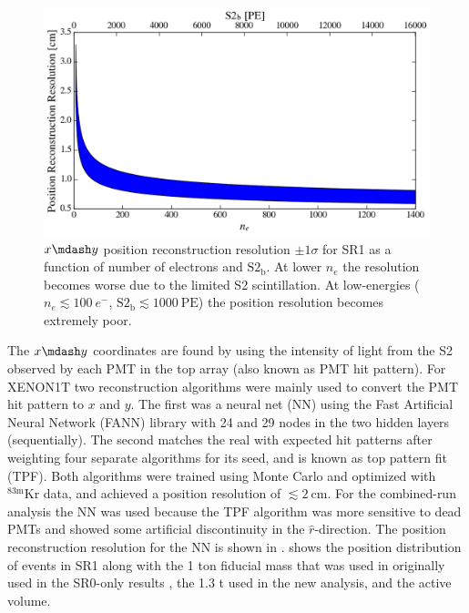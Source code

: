 \begin{figure}
\centering
\includegraphics[width=\textwidth]{PosRecRes}
\caption{$x \mdash y$ position reconstruction resolution $\pm 1\sigma$ for SR1 as a function of number of electrons and
$\mathrm{S2_b}$.  At lower $n_e$ the
resolution becomes worse due to the limited S2 scintillation.  At low-energies ($n_e \lesssim 100\ e^-$,
$\mathrm{S2_b} \lesssim 1000\ \mathrm{PE}$) the position resolution becomes extremely poor.}
\label{fig:calibrations_position_reconstruction_res}
\end{figure}

The $x \mdash y$ coordinates are found by using the intensity of light from the S2 observed by each PMT in the top array (also
known as PMT hit pattern).  For XENON1T two reconstruction algorithms were mainly used to convert the PMT hit pattern to $x$ and $y$.  The
first was a neural net (NN) using the Fast Artificial
Neural Network (FANN) library with 24 and 29 nodes in the two hidden layers (sequentially).  The second matches the real with expected hit
patterns after weighting four separate algorithms for its seed, and is known as top pattern fit (TPF).  Both algorithms were trained using
Monte Carlo and optimized with $\mathrm{^{83m}Kr}$ data, and achieved a position resolution of $\lesssim 2\ \mathrm{cm}$.  For the
combined-run analysis the NN was used because the TPF algorithm was more sensitive to dead PMTs and showed some artificial discontinuity
in the $\hat{r}$-direction.  The position reconstruction resolution for the NN is shown in
.   shows the position distribution
of events in SR1 along with
the 1 ton fiducial mass that was used in originally used in the SR0-only results , the 1.3 t used in the new
analysis, and the active volume.

